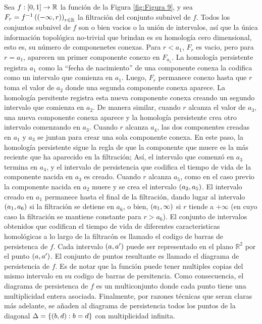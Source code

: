 Sea $f:\left[0,1\right]\rightarrow\mathbb{R}$ la funci\'on de la Figura \ref{fig:Figura 9},
y sea $F_{r} = f^{-1}\left(\left(-\infty,r\right)\right)_{r\in\mathbb{R}}$ la filtraci\'on del conjunto subnivel de $f$.
Todos los conjuntos subnivel de $f$ son o bien vacios o la uni\'on de intervalos,
as\'i que la \'unica informaci\'on topol\'ogica no-trivial que brindan es su homolog\'ia cero dimensional, esto es, su n\'umero de componenetes conexas.
Para $r<a_{1}$, $F_{r}$ es vacio, pero para $r = a_{1}$, aparecen un primer componente conexo en $F_{a_{1}}$.
La homolog\'ia persistente registra $a_{1}$ como la ``fecha de nacimiento'' de una componente conexa la codifica como un intervalo que comienza en $a_{1}$.
Luego, $F_{r}$ permanece conexo hasta que $r$ toma el valor de $a_{2}$ donde una segunda componente conexa aparece.
La homolog\'ia persitente registra esta nueva componente conexa creando un segundo intervalo que comienza en $a_{2}$.
De manera similar, cuando $r$ alcanza el valor de $a_{3}$, una nueva componente conexa aparece y la homolog\'ia persistente crea otro intervalo comenzando en $a_{3}$.
Cuando $r$ alcanza $a_{4}$, las dos componentes creadas en $a_{1}$ y $a_{3}$ se juntan para crear una sola componente conexa.
En este paso, la homolog\'ia persistente sigue la regla de que la componente que muere es la m\'as reciente que ha aparecido en la filtraci\'on;
As\'i, el intervalo que comenz\'o en $a_{3}$ termina en $a_{4}$,
y el intervalo de persistencia que codifica el tiempo de vida de la componente nacida en $a_{3}$ es creado.
Cuando $r$ alcanza $a_{5}$, como en el caso previo la componente nacida en $a_{2}$ muere y se crea el intervalo $\left(a_{2},a_{5}\right)$.
El intervalo creado en $a_{1}$ permanece hasta el final de la filtraci\'on,
dando lugar al intervalo $\left(a_{1},a_{6}\right)$ si la filtraci\'on se detiene en $a_{6}$,
o bien, $\left(a_{1},\infty\right)$ si $r$ tiende a $+\infty$ (en cuyo caso la filtraci\'on se mantiene constante para $r>a_{6}$).
El conjunto de intervalos obtenidos que codifican el tiempo de vida de diferentes caracteristicas homol\'ogicas a lo largo de la filtrac\'on es llamado el codigo de barras de persistenca de $f$.
Cada intervalo $\left(a,a'\right)$ puede ser representado en el plano $\mathbb{R}^{2}$ por el punto $\left(a,a'\right)$.
El conjunto de puntos resultante es llamado el diagrama de persistencia de $f$.
Es de notar que la funci\'on puede tener multiples copias del mismo intervalo en su codigo de barras de persitencia.
Como consecuencia, el diagrama de persistenca de $f$ es un multiconjunto donde cada punto tiene una multiplicidad entera asociada.
Finalmente, por razones t\'ecnicas que seran claras m\'as adelante,
se a\~{n}aden al diagrama de persistencia todos los puntos de la diagonal $\Delta = \left\{\left(b,d\right): b=d\right\}$ con multiplicidad infinita.

